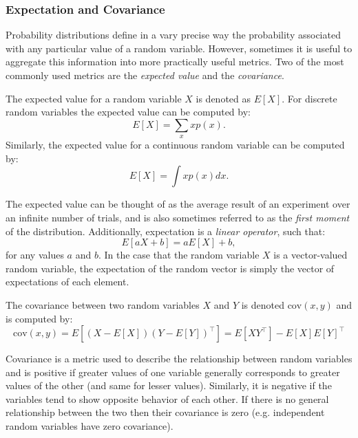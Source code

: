 \subsubsection{Expectation and Covariance}
Probability distributions define in a vary precise way the probability associated with any particular value of a random variable. However, sometimes it is useful to aggregate this information into more practically useful metrics. Two of the most commonly used metrics are the \textit{expected value} and the \textit{covariance}.
\begin{definition}
The expected value for a random variable $X$ is denoted as $E[X]$. For discrete random variables the expected value can be computed by:
\begin{equation*}
    E[X] = \sum_x x p(x).
\end{equation*}
Similarly, the expected value for a continuous random variable can be computed by:
\begin{equation*}
    E[X] = \int x p(x) dx.
\end{equation*}
\end{definition}
The expected value can be thought of as the average result of an experiment over an infinite number of trials, and is also sometimes referred to as the \textit{first moment} of the distribution.
Additionally, expectation is a \textit{linear operator}, such that:
\begin{equation*}
    E[aX + b]= aE[X] + b,
\end{equation*}
for any values $a$ and $b$.
In the case that the random variable $X$ is a vector-valued random variable, the expectation of the random vector is simply the vector of expectations of each element.

\begin{definition}[Covariance]
The covariance between two random variables $X$ and $Y$ is denoted $\text{cov}(x,y)$ and is computed by:
\begin{equation*}
    \text{cov}(x,y) = E[(X-E[X])(Y-E[Y])^\top ] = E[XY^\top ] - E[X]E[Y]^\top 
\end{equation*}
\end{definition}
Covariance is a metric used to describe the relationship between random variables and is positive if greater values of one variable generally corresponds to greater values of the other (and same for lesser values). Similarly, it is negative if the variables tend to show opposite behavior of each other. If there is no general relationship between the two then their covariance is zero (e.g. independent random variables have zero covariance).


